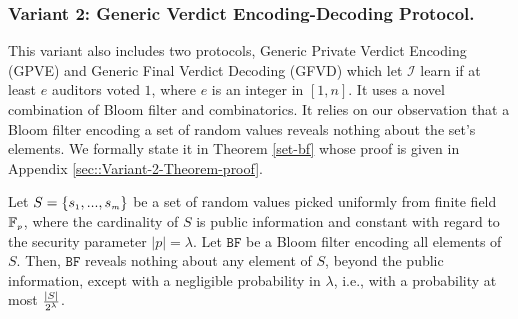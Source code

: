  
 

 
 




\clearpage


\subsubsection{Variant 2: Generic Verdict  Encoding-Decoding Protocol.} This variant also includes two protocols, Generic Private Verdict Encoding (GPVE) and Generic Final Verdict Decoding (GFVD) which let $\mathcal{I}$ learn if at least $e$ auditors voted $1$, where $e$ is an integer in  $[1, n]$. It uses a novel combination of   Bloom filter and combinatorics. It relies on our observation that a Bloom filter encoding a set of random values reveals nothing about the set's elements.  We formally state it in Theorem \ref{set-bf} whose proof is given in Appendix \ref{sec::Variant-2-Theorem-proof}. 


%




\begin{theorem}\label{set-bf}
Let  $S=\{s_{\scriptscriptstyle 1},..., s_{\scriptscriptstyle m}\}$ be a set of random values picked uniformly from finite field $\mathbb{F}_{\scriptscriptstyle p}$, where the cardinality of $S$ is public information and constant with regard to the security parameter $|p|=\lambda$. Let $\mathtt{BF}$ be a Bloom filter encoding all elements of   $S$. Then,  $\mathtt{BF}$ reveals nothing about any element of $S$, beyond the public information, except with a negligible probability in  $\lambda$, i.e., with a probability at most $\frac{|S|}{2^{\scriptscriptstyle \lambda}}$. 
\end{theorem}

